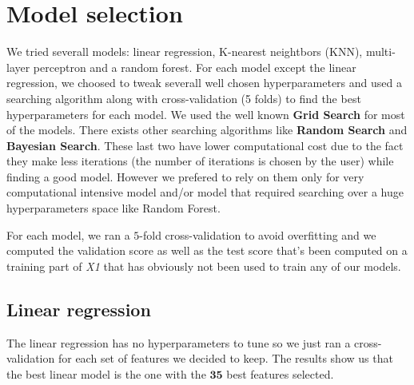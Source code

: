 \section{Model selection}

We tried severall models: linear regression, K-nearest neightbors (KNN), multi-layer perceptron and a random forest. For each model except the linear regression, we choosed to tweak severall well chosen hyperparameters and used a searching algorithm along with cross-validation (5 folds) to find the best hyperparameters for each model. We used the well known \textbf{Grid Search} for most of the models. There exists other searching algorithms like \textbf{Random Search} and \textbf{Bayesian Search}. These last two have lower computational cost due to the fact they make less iterations (the number of iterations is chosen by the user) while finding a good model. However we prefered to rely on them only for very computational intensive model and/or model that required searching over a huge hyperparameters space like Random Forest.

For each model, we ran a $5$-fold cross-validation to avoid overfitting and we computed the validation score as well as the test score that's been computed on a training part of \textit{X1} that has obviously not been used to train any of our models.

\subsection{Linear regression}

The linear regression has no hyperparameters to tune so we just ran a cross-validation for each set of features we decided to keep. The results show us that the best linear model is the one with the $\textbf{35}$ best features selected.

